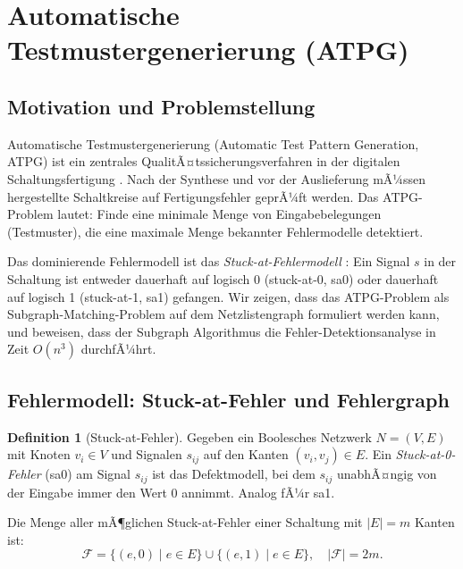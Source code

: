 ﻿\documentclass[a4paper,12pt]{article}
\theoremstyle{definition}
\newtheorem{definition}{Definition}
\begin{document}
\section{Automatische Testmustergenerierung (ATPG)}

\subsection{Motivation und Problemstellung}

Automatische Testmustergenerierung (Automatic Test Pattern Generation, ATPG) ist ein
zentrales QualitÃ¤tssicherungsverfahren in der digitalen Schaltungsfertigung
\cite[Kap.~12]{ciletti2011}. Nach der Synthese und vor der Auslieferung mÃ¼ssen
hergestellte Schaltkreise auf Fertigungsfehler geprÃ¼ft werden. Das ATPG-Problem
lautet: Finde eine minimale Menge von Eingabebelegungen (Testmuster), die eine maximale
Menge bekannter Fehlermodelle detektiert.

Das dominierende Fehlermodell ist das \emph{Stuck-at-Fehlermodell}
\cite[S.~820]{ciletti2011}: Ein Signal $s$ in der Schaltung ist entweder dauerhaft
auf logisch 0 (stuck-at-0, sa0) oder dauerhaft auf logisch 1 (stuck-at-1, sa1)
gefangen. Wir zeigen, dass das ATPG-Problem als Subgraph-Matching-Problem auf dem
Netzlistengraph formuliert werden kann, und beweisen, dass der Subgraph Algorithmus
die Fehler-Detektionsanalyse in Zeit $O(n^3)$ durchfÃ¼hrt.

\subsection{Fehlermodell: Stuck-at-Fehler und Fehlergraph}

\begin{definition}[Stuck-at-Fehler]\label{def:stuckat}
  Gegeben ein Boolesches Netzwerk $N = (V, E)$ mit Knoten $v_i \in V$ und Signalen
  $s_{ij}$ auf den Kanten $(v_i, v_j) \in E$. Ein \emph{Stuck-at-0-Fehler} (sa0) am
  Signal $s_{ij}$ ist das Defektmodell, bei dem $s_{ij}$ unabhÃ¤ngig von der Eingabe
  immer den Wert 0 annimmt. Analog fÃ¼r sa1.

  Die Menge aller mÃ¶glichen Stuck-at-Fehler einer Schaltung mit $|E| = m$ Kanten ist:
  \[
    \mathcal{F} = \{(e, 0) \mid e \in E\} \cup \{(e, 1) \mid e \in E\},
    \quad |\mathcal{F}| = 2m.
  \]
\end{definition}
\end{document}
